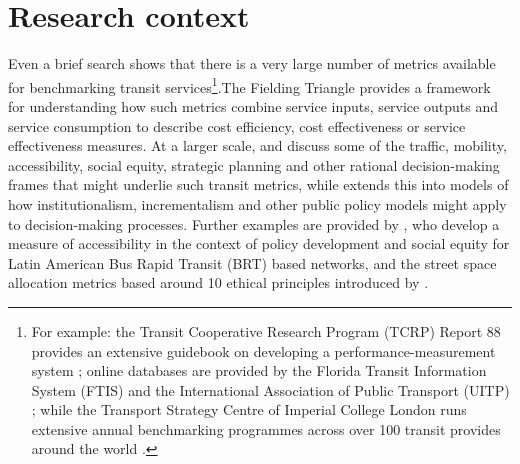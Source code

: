 \documentclass[]{tufte-book}
\begin{document}
\hypertarget{research-context}{%
\chapter{Research context}\label{research-context}}

Even a brief search shows that there is a very large number of metrics
available for benchmarking transit services\footnote{For example: the
  Transit Cooperative Research Program (TCRP) Report 88 provides an
  extensive guidebook on developing a performance-measurement system
  \citep{Ryus:2003aa}; online databases are provided by the Florida
  Transit Information System (FTIS)
  \citep{Florida-Transit-Information-System:2018aa} and the
  International Association of Public Transport (UITP)
  \citep{UITP:2015aa}; while the Transport Strategy Centre of Imperial
  College London runs extensive annual benchmarking programmes across
  over 100 transit provides around the world
  \citep{Imperial-College-London:2023aa}.}.The Fielding Triangle
\citep{FieldingGordonJ1987Mpts} provides a framework for understanding
how such metrics combine service inputs, service outputs and service
consumption to describe cost efficiency, cost effectiveness or service
effectiveness measures. At a larger scale, \citet{Litman:2003ab} and
\citet{Litman:2016aa} discuss some of the traffic, mobility,
accessibility, social equity, strategic planning and other rational
decision-making frames that might underlie such transit metrics, while
\citet{Reynolds:2017ah} extends this into models of how
institutionalism, incrementalism and other public policy models might
apply to decision-making processes. Further examples are provided by
\citet{GuzmanLuisA.2017Aeit}, who develop a measure of accessibility in
the context of policy development and social equity for Latin American
Bus Rapid Transit (BRT) based networks, and the street space allocation
metrics based around 10 ethical principles introduced by
\citet{Creutzig2020streetspaceallocation}.
\end{document}
